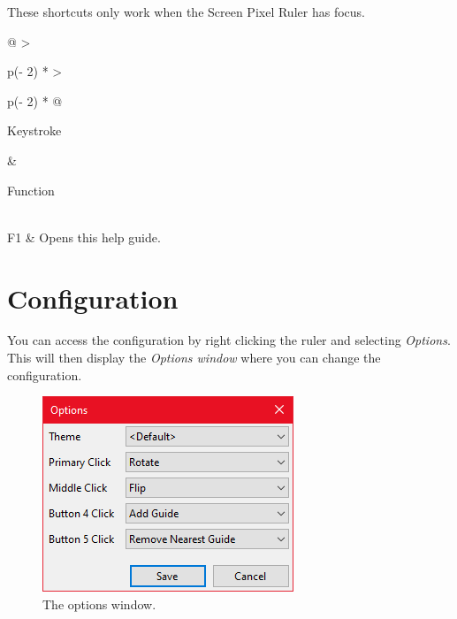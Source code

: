 \documentclass[
]{book}
\begin{document}
These shortcuts only work when the Screen Pixel Ruler has focus.

\begin{longtable}[]{@{}
  >{\raggedright\arraybackslash}p{(\columnwidth - 2\tabcolsep) * }
  >{\raggedright\arraybackslash}p{(\columnwidth - 2\tabcolsep) * }@{}}
\toprule\noalign{}
\begin{minipage}[b]{\linewidth}\raggedright
Keystroke
\end{minipage} & \begin{minipage}[b]{\linewidth}\raggedright
Function
\end{minipage} \\
\midrule\noalign{}
\endhead
\bottomrule\noalign{}
\endlastfoot
F1 & Opens this help guide. \\
\end{longtable}

\chapter{Configuration}\label{config}

You can access the configuration by right clicking the ruler and selecting \emph{Options}.
This will then display the \emph{Options window} where you can change the configuration.

\begin{figure}
\includegraphics[width=1\linewidth]{images/options} \caption{The options window.}\label{fig:unnamed-chunk-4}
\end{figure}
\end{document}
